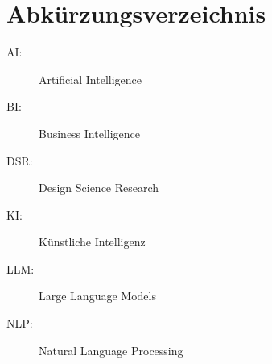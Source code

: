 

\section *{Abkürzungsverzeichnis} %
\begin{description}
    \item[AI:] Artificial Intelligence
    \item[BI:] Business Intelligence
    \item[DSR:] Design Science Research
    \item[KI:] Künstliche Intelligenz
    \item[LLM:] Large Language Models
    \item[NLP:] Natural Language Processing
\end{description}
